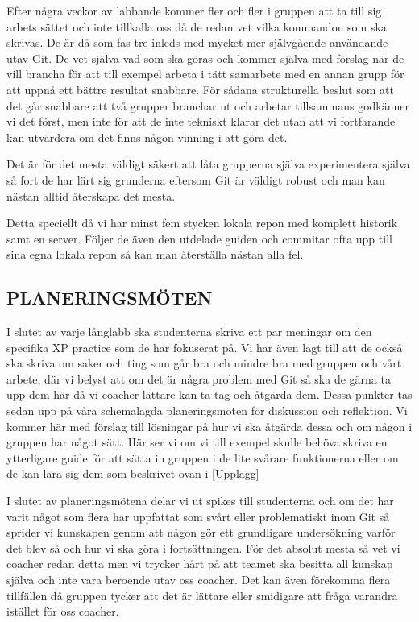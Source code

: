 Efter några veckor av labbande kommer fler och fler i gruppen att ta till sig arbets sättet och inte tillkalla oss då de redan vet vilka kommandon som ska skrivas. De är då som fas tre inleds med mycket mer självgående användande utav Git. De vet själva vad som ska göras och kommer själva med förslag när de vill brancha för att till exempel arbeta i tätt samarbete med en annan grupp för att uppnå ett bättre resultat snabbare. För sådana strukturella beslut som att det går snabbare att två grupper branchar ut och arbetar tillsammans godkänner vi det först, men inte för att de inte tekniskt klarar det utan att vi fortfarande kan utvärdera om det finns någon vinning i att göra det.

Det är för det mesta väldigt säkert att låta grupperna själva experimentera själva så fort de har lärt sig grunderna eftersom Git är väldigt robust och man kan nästan alltid återskapa det mesta.

Detta speciellt då vi har minst fem stycken lokala repon med komplett historik samt en server. Följer de även den utdelade guiden och commitar ofta upp till sina egna lokala repon så kan man återställa nästan alla fel.

\subsection{PLANERINGSMÖTEN}

I slutet av varje långlabb ska studenterna skriva ett par meningar om den specifika XP practice som de har fokuserat på. Vi har även lagt till att de också ska skriva om saker och ting som går bra och mindre bra med gruppen och vårt arbete, där vi belyst att om det är några problem med Git så ska de gärna ta upp dem här då vi coacher lättare kan ta tag och åtgärda dem. Dessa punkter tas sedan upp på våra schemalagda planeringsmöten för diskussion och reflektion. Vi kommer här med förslag till lösningar på hur vi ska åtgärda dessa och om någon i gruppen har något sätt. Här ser vi om vi till exempel skulle behöva skriva en ytterligare guide för att sätta in gruppen i de lite svårare funktionerna eller om de kan lära sig dem som beskrivet ovan i \ref{Upplagg} 

I slutet av planeringsmötena delar vi ut spikes till studenterna och om det har varit något som flera har uppfattat som svårt eller problematiskt inom Git så sprider vi kunskapen genom att någon gör ett grundligare undersökning varför det blev så och hur vi ska göra i fortsättningen. För det absolut mesta så vet vi coacher redan detta men  vi trycker hårt på att teamet ska besitta all kunskap själva och inte vara beroende utav oss coacher. Det kan även förekomma flera tillfällen då gruppen tycker att det är lättare eller smidigare att fråga varandra istället för oss coacher.

